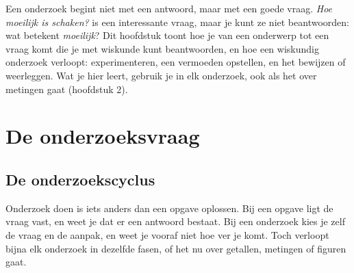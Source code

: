 %



Een onderzoek begint niet met een antwoord, maar met een goede vraag. \textit{Hoe moeilijk is schaken?} is een interessante vraag, maar je kunt ze niet beantwoorden: wat betekent \textit{moeilijk}? Dit hoofdstuk toont hoe je van een onderwerp tot een vraag komt die je met wiskunde kunt beantwoorden, en hoe een wiskundig onderzoek verloopt: experimenteren, een vermoeden opstellen, en het bewijzen of weerleggen. Wat je hier leert, gebruik je in elk onderzoek, ook als het over metingen gaat (hoofdstuk 2).

\begin{oefeningen}[Start]

\end{oefeningen}

\section{De onderzoeksvraag}

\subsection{De onderzoekscyclus}

Onderzoek doen is iets anders dan een opgave oplossen. Bij een opgave ligt de vraag vast, en weet je dat er een antwoord bestaat. Bij een onderzoek kies je zelf de vraag en de aanpak, en weet je vooraf niet hoe ver je komt. Toch verloopt bijna elk onderzoek in dezelfde fasen, of het nu over getallen, metingen of figuren gaat.

